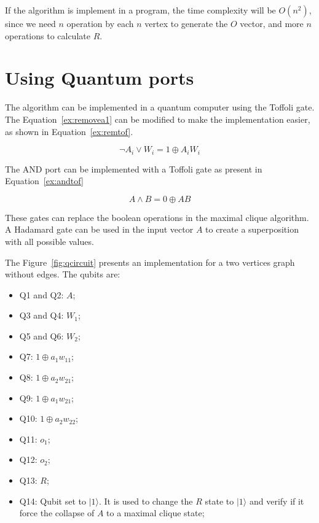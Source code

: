 \documentclass[a4paper,12pt]{article}
\begin{document}
If the algorithm is implement in a program, the time complexity will be $O(n^2)$, since we need $n$ operation by each $n$ vertex to generate the $O$ vector, and more $n$ operations to calculate $R$.

\section{Using Quantum ports}

The algorithm can be implemented in a quantum computer using the Toffoli gate. The Equation~\ref{ex:removea1} can be modified to make the implementation easier, as shown in Equation~\ref{ex:remtof}.

\begin{equation}
	\neg A_i \lor W_i = 1 \oplus A_i W_i \label{ex:remtof}
\end{equation}

The AND port can be implemented with a Toffoli gate as present in Equation~\ref{ex:andtof} 

\begin{equation}
	A \land B = 0 \oplus AB \label{ex:andtof}
\end{equation}

These gates can replace the boolean operations in the maximal clique algorithm. A Hadamard gate can be used in the input vector $A$ to create a superposition with all possible values.

The Figure~\ref{fig:qcircuit} presents an implementation for a two vertices graph without edges. The qubits are:

\begin{itemize}
	\item Q1 and Q2: $A$;
	\item Q3 and Q4: $W_1$;
	\item Q5 and Q6: $W_2$;
	\item Q7: $1 \oplus a_1 w_{11}$;
	\item Q8: $1 \oplus a_2 w_{21}$;
	\item Q9: $1 \oplus a_1 w_{21}$;
	\item Q10: $1 \oplus a_2 w_{22}$;
	\item Q11: $o_{1}$;
	\item Q12: $o_{2}$;
	\item Q13: $R$;
	\item Q14: Qubit set to $|1\rangle$. It is used to change the $R$ state to $|1\rangle$ and verify if it force the collapse of $A$ to a maximal clique state; 
\end{itemize}
\end{document}
